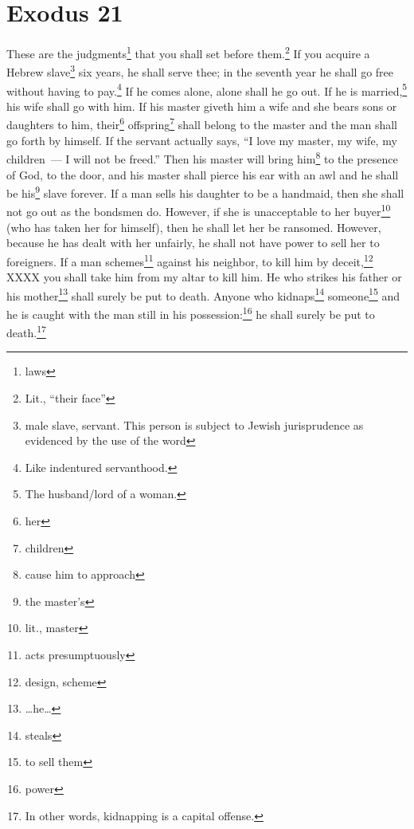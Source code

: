 \section{Exodus 21}\label{Exodus 21}
\begin{enumerate}[align=center]
     These are the judgments\footnote{laws} that you shall set before them.\footnote{Lit., ``their face''}%
     If you acquire a Hebrew slave\footnote{male slave, servant. This person is subject to Jewish jurisprudence as evidenced by the use of the word } six years, he shall serve thee; in the seventh year he shall go free without having to pay.\footnote{Like indentured servanthood.}%
     If he comes alone, alone shall he go out. If he is married,\footnote{The husband/lord of a woman.} his wife shall go with him.%
     If his master giveth him a wife and she bears sons or daughters to him, their\footnote{her} offspring\footnote{children} shall belong to the master and the man shall go forth by himself.%
     If the servant actually says, ``I love my master, my wife, my children~--- I will not be freed.''%
     Then his master will bring him\footnote{cause him to approach} to the presence of God, to the door, and his master shall pierce his ear with an awl and he shall be his\footnote{the master's} slave forever.%
     If a man sells his daughter to be a handmaid, then she shall not go out as the bondsmen do.%
     However, if she is unacceptable to her buyer\footnote{lit., master} (who has taken her for himself), then he shall let her be ransomed. However, because he has dealt with her unfairly, he shall not have power to sell her to foreigners.%
     If a man schemes\footnote{acts presumptuously} against his neighbor, to kill him by deceit,\footnote{design, scheme} XXXX you shall take him from my altar to kill him.%
     He who strikes his father or his mother\footnote{\dots he\dots} shall surely be put to death.%
     Anyone who kidnaps\footnote{steals} someone\footnote{to sell them} and he is caught with the man still in his possession:\footnote{power} he shall surely be put to death.\footnote{In other words, kidnapping is a capital offense.}%

\end{enumerate}
